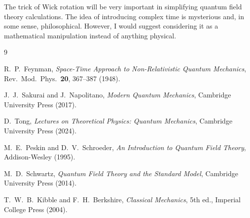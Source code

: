 \documentclass[12pt,a4paper]{article}
\begin{document}
The trick of Wick rotation will be very important in simplifying quantum field theory calculations. 
The idea of introducing complex time is mysterious and, in some sense, philosophical. 
However, I would suggest considering it as a mathematical manipulation instead of anything physical.


\newpage
\begin{thebibliography}{9}

R.~P.~Feynman,
\textit{Space-Time Approach to Non-Relativistic Quantum Mechanics},
Rev.\ Mod.\ Phys.\ \textbf{20}, 367--387 (1948).


J.~J.~Sakurai and J.~Napolitano, 
\textit{Modern Quantum Mechanics}, 
Cambridge University Press (2017).

D.~Tong,
\textit{Lectures on Theoretical Physics: Quantum Mechanics},
Cambridge University Press (2024).

M.~E.~Peskin and D.~V.~Schroeder, 
\textit{An Introduction to Quantum Field Theory}, 
Addison-Wesley (1995).

M.~D.~Schwartz, 
\textit{Quantum Field Theory and the Standard Model}, 
Cambridge University Press (2014).

T.~W.~B.~Kibble and F.~H.~Berkshire,
\textit{Classical Mechanics},
5th ed., Imperial College Press (2004).

\end{thebibliography}
\end{document}
